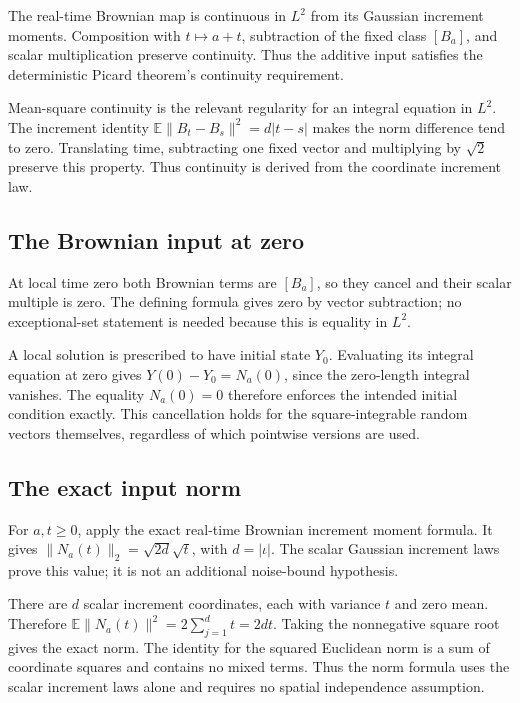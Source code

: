\documentclass[11pt,a4paper]{article}
\begin{document}
The real-time Brownian map is continuous in \(L^2\) from its Gaussian increment moments. Composition with \(t\mapsto a+t\), subtraction of the fixed class \([B_a]\), and scalar multiplication preserve continuity. Thus the additive input satisfies the deterministic Picard theorem's continuity requirement.



Mean-square continuity is the relevant regularity for an integral equation in \(L^2\). The increment identity \(\mathbb E\|B_t-B_s\|^2=d|t-s|\) makes the norm difference tend to zero. Translating time, subtracting one fixed vector and multiplying by \(\sqrt2\) preserve this property. Thus continuity is derived from the coordinate increment law.


\subsection{\texorpdfstring{The Brownian input at zero}{The Brownian input at zero}}


At local time zero both Brownian terms are \([B_a]\), so they cancel and their scalar multiple is zero. The defining formula gives zero by vector subtraction; no exceptional-set statement is needed because this is equality in \(L^2\).



A local solution is prescribed to have initial state \(Y_0\). Evaluating its integral equation at zero gives \(Y(0)-Y_0=N_a(0)\), since the zero-length integral vanishes. The equality \(N_a(0)=0\) therefore enforces the intended initial condition exactly. This cancellation holds for the square-integrable random vectors themselves, regardless of which pointwise versions are used.


\subsection{\texorpdfstring{The exact input norm}{The exact input norm}}


For \(a,t\ge0\), apply the exact real-time Brownian increment moment formula. It gives \(\|N_a(t)\|_2=\sqrt{2d}\sqrt t\), with \(d=|\iota|\). The scalar Gaussian increment laws prove this value; it is not an additional noise-bound hypothesis.



There are \(d\) scalar increment coordinates, each with variance \(t\) and zero mean. Therefore \(\mathbb E\|N_a(t)\|^2=2\sum_{j=1}^d t=2dt\). Taking the nonnegative square root gives the exact norm. The identity for the squared Euclidean norm is a sum of coordinate squares and contains no mixed terms. Thus the norm formula uses the scalar increment laws alone and requires no spatial independence assumption.
\end{document}
